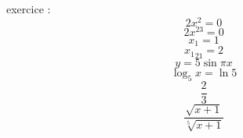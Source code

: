 

exercice :
$$2x^2 = 0$$
$$2x^{23} = 0$$
$$ x_1 = 1 $$
$${x_1}_21 = 2 $$
$$ y = 5\sin{\pi}x$$
$$\log_5{x}=\ln{5}$$
$$\displaystyle{\frac{2}{3}}$$
$$\frac{\sqrt{x+1}}{\sqrt[5]{x+1}}$$ 

